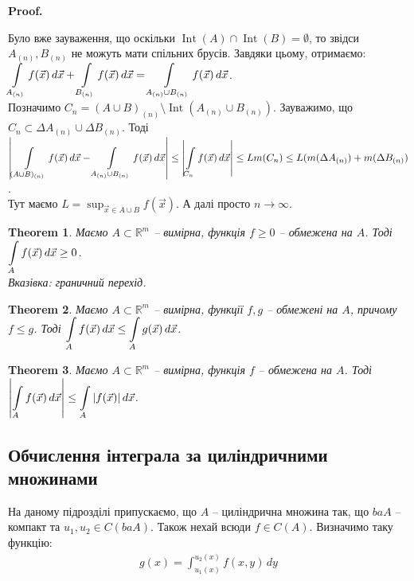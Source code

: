 \documentclass[a4paper, 10pt]{article}
\makeatletter
\def\qed{$\blacksquare$}
\theoremstyle{theoremdd}
\newtheorem{theorem}{Theorem}[subsection]
\theoremstyle{theoremdd}
\theoremstyle{theoremdd}
\theoremstyle{theoremdd}
\theoremstyle{theoremdd}
\theoremstyle{theoremdd}
\theoremstyle{theoremdd}
\theoremstyle{theoremdd}
\renewenvironment{proof}[1][Proof.\\]{\par
\pushQED{\hfill \qed}%
\normalfont \topsep6\p@\@plus6\p@\relax
\trivlist
\item\relax
{\bfseries
#1\@addpunct{.}}\hspace\labelsep\ignorespaces
}{%
\popQED\endtrivlist\@endpefalse
}
\DeclareMathOperator{\Int}{Int}
\makeatother
\begin{document}
\begin{proof}
Було вже зауваження, що оскільки $\Int(A) \cap \Int(B) = \emptyset$, то звідси $A_{(n)},B_{(n)}$ не можуть мати спільних брусів. Завдяки цьому, отримаємо:\\
$\displaystyle\int\displaylimits_{A_{(n)}} f(\vec{x})\,d\vec{x} + \int\displaylimits_{B_{(n)}} f(\vec{x})\,d\vec{x} = \int\displaylimits_{A_{(n)} \cup B_{(n)}} f(\vec{x})\,d\vec{x}$.\\
Позначимо $C_n = (A \cup B)_{(n)} \setminus \Int( A_{(n)} \cup B_{(n)} )$. Зауважимо, що $C_n \subset \Delta A_{(n)} \cup \Delta B_{(n)}$. Тоді\\
$\displaystyle\abs{\int\displaylimits_{(A \cup B)_{(n)}} f(\vec{x})\,d\vec{x} - \int\displaylimits_{A_{(n)} \cup B_{(n)}} f(\vec{x})\,d\vec{x}} \leq \abs{\int\displaylimits_{C_n} f(\vec{x})\,d\vec{x}} \leq L m(C_n) \leq L(m(\Delta A_{(n)}) + m(\Delta B_{(n)})$.\\
Тут маємо $L = \displaystyle\sup_{\vec{x} \in A \cup B} f(\vec{x})$. А далі просто $n \to \infty$.
\end{proof}

\begin{theorem}
Маємо $A \subset \mathbb{R}^m$ -- вимірна, функція $f \geq 0$ -- обмежена на $A$. Тоді $\displaystyle\int\displaylimits_A f(\vec{x})\,d\vec{x} \geq 0$.\\
\textit{Вказівка: граничний перехід.}
\end{theorem}

\begin{theorem}
Маємо $A \subset \mathbb{R}^m$ -- вимірна, функції $f,g$ -- обмежені на $A$, причому $f \leq g$. Тоді $\displaystyle\int\displaylimits_A f(\vec{x})\,d\vec{x} \leq \int\displaylimits_A g(\vec{x})\,d\vec{x}$.
\end{theorem}

\begin{theorem}
Маємо $A \subset \mathbb{R}^m$ -- вимірна, функція $f$ -- обмежена на $A$. Тоді $\displaystyle\abs{\int\displaylimits_A f(\vec{x})\,d\vec{x}} \leq \int\displaylimits_A |f(\vec{x})|\,d\vec{x}$.
\end{theorem}



\subsection{Обчислення інтеграла за циліндричними множинами}
На даному підрозділі припускаємо, що $A$ -- циліндрична множина так, що $baA$ -- компакт та $u_1,u_2 \in C(baA)$. Також нехай всюди $f \in C(A)$. Визначимо таку функцію:
\begin{align*}
g(x)= \int_{u_1(x)}^{u_2(x)} f(x,y)\,dy
\end{align*}
\end{document}
